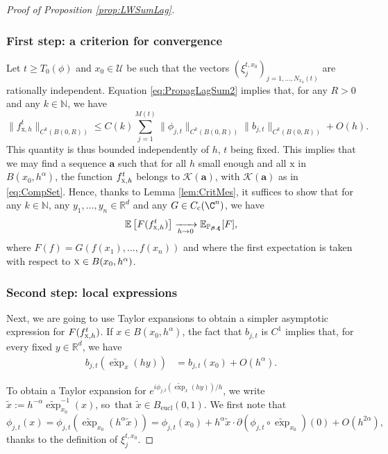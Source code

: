 \documentclass[10pt]{amsart}
\let\mathcal\mathscr
\newcommand{\rc}{\mathrm{c}}
\newcommand{\eucl}{\mathrm{eucl}}
\theoremstyle{plain}
\theoremstyle{definition}
\newcommand{\N}{\mathbb{N}}
\newcommand{\R}{\mathbb{R}}
\def\calU{\mathcal{U}}
\begin{document}
\skpt
\begin{proof}[Proof of Proposition \ref{prop:LWSumLag}]

\subsubsection*{First step: a criterion for convergence}

Let $t\geq T_0(\phi)$ and $x_0\in\calU$ be such that the vectors $(\xi_j^{t,x_0})_{j=1,\dots,N_{x_0}(t)}$ are rationally independent.
Equation \eqref{eq:PropagLagSum2} implies that, for any $R>0$ and any $k\in \N$, we have\vspace*{-3pt}
\[
\|f_{\mathrm{x},h}^t\|_{C^k(B(0,R))}\leq C(k) \sum_{j=1}^{M(t)} \|\phi_{j,t}\|_{C^k(B(0,R))} \|b_{j,t}\|_{C^k(B(0,R))} +O(h).
\]
This quantity is thus bounded independently of $h$, $t$ being fixed. This implies that we may find a sequence $\boldsymbol{a}$ such that for all $h$ small enough and all $\mathrm{x}$ in $B(x_0,h^\alpha)$, the function $f^t_{\textsc{x},h}$ belongs to $\mathcal{K}(\boldsymbol{a})$, with $\mathcal{K}(\boldsymbol{a})$ as in \eqref{eq:CompSet}. Hence, thanks to Lemma \ref{lem:CritMes}, it suffices to show that for any $k\in \N$, any $y_1,\dots,y_n\in \R^d$ and any $G\in C_\rc(\C^n)$, we have\vspace*{-3pt}
\[
\mathbb{E} \left[F(f^t_{\textsc{x},h})\right] \xrightarrow[h \to 0]{} \mathbb{E}_{\mathbb{P}_{\boldsymbol{\beta},\boldsymbol{\xi}}}[ F],
\]
where $F(f) = G(f(x_1), \dots, f(x_n))$ and where
the first expectation is taken with respect to $\textsc{x}\in B(x_0, h^\alpha)$.

\subsubsection*{Second step: local expressions}

Next, we are going to use Taylor expansions to obtain a simpler asymptotic expression for $F(f^t_{\textsc{x},h})$. If $x\in B(x_0, h^{\alpha})$, the fact that $b_{j,t}$ is $C^1$ implies that, for every fixed $y \in \R^d$, we have
\begin{align*}
b_{j,t}(\widetilde{\exp}_x(hy))&= b_{j,t}(x_0) + O(h^\alpha).
\end{align*}

To obtain a Taylor expansion for $e^{i\phi_{j,t}(\widetilde{\exp}_x(hy))/h}$, we write $\tilde{x}:= h^{-\alpha} \widetilde{\exp}_{x_0}^{-1}(x)$, so~that $\tilde{x} \in B_{\eucl}(0,1)$.
We first note that
\[
\phi_{j,t}(x)= \phi_{j,t}(\widetilde{\exp}_{x_0}(h^{\alpha} \tilde{x})) = \phi_{j,t}(x_0) + h^\alpha \tilde{x} \cdot \partial \left(\phi_{j,t}\circ \widetilde{\exp}_{x_0} \right)(0) + O(h^{2\alpha}),
\]
thanks to the definition of $\xi_j^{t, x_0}$.


\end{proof}
\end{document}
